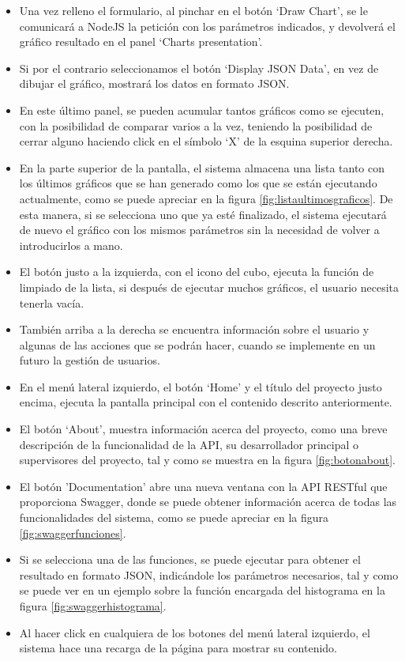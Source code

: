 \begin{itemize}
	\item Una vez relleno el formulario, al pinchar en el botón ‘Draw Chart’, se le comunicará a NodeJS la petición con los parámetros indicados, y devolverá el gráfico resultado en el panel ‘Charts presentation’. 
	\item Si por el contrario seleccionamos el botón ‘Display JSON Data’, en vez de dibujar el gráfico, mostrará los datos en formato JSON.
	\item En este último panel, se pueden acumular tantos gráficos como se ejecuten, con la posibilidad de comparar varios a la vez, teniendo la posibilidad de cerrar alguno haciendo click en el símbolo ‘X’ de la esquina superior derecha.
	\item En la parte superior de la pantalla, el sistema almacena una lista tanto con los últimos gráficos que se han generado como los que se están ejecutando actualmente, como se puede apreciar en la figura \ref{fig:listaultimosgraficos}. De esta manera, si se selecciona uno que ya esté finalizado, el sistema ejecutará de nuevo el gráfico con los mismos parámetros sin la necesidad de volver a introducirlos a mano.
	\item El botón justo a la izquierda, con el icono del cubo, ejecuta la función de limpiado de la lista, si después de ejecutar muchos gráficos, el usuario necesita tenerla vacía.
	\item También arriba a la derecha se encuentra información sobre el usuario y algunas de las acciones que se podrán hacer, cuando se implemente en un futuro la gestión de usuarios.
	\item En el menú lateral izquierdo, el botón ‘Home’ y el título del proyecto justo encima, ejecuta la pantalla principal con el contenido descrito anteriormente.
	\item El botón ‘About’, muestra información acerca del proyecto, como una breve descripción de la funcionalidad de la API, su desarrollador principal o supervisores del proyecto, tal y como se muestra en la figura \ref{fig:botonabout}.
	\item El botón 'Documentation' abre una nueva ventana con la API RESTful que proporciona Swagger, donde se puede obtener información acerca de todas las funcionalidades del sistema, como se puede apreciar en la figura \ref{fig:swaggerfunciones}.
	\item Si se selecciona una de las funciones, se puede ejecutar para obtener el resultado en formato JSON, indicándole los parámetros necesarios, tal y como se puede ver en un ejemplo sobre la función encargada del histograma en la figura \ref{fig:swaggerhistograma}.
	\item Al hacer click en cualquiera de los botones del menú lateral izquierdo, el sistema hace una recarga de la página para mostrar su contenido.
\end{itemize}

